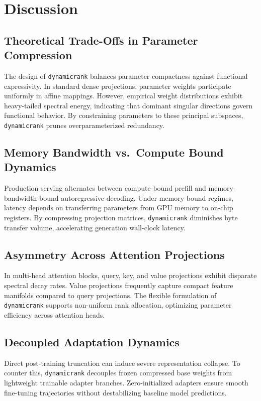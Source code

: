 \section{Discussion}

\subsection{Theoretical Trade-Offs in Parameter Compression}
The design of \texttt{dynamicrank} balances parameter compactness against functional expressivity. In standard dense projections, parameter weights participate uniformly in affine mappings. However, empirical weight distributions exhibit heavy-tailed spectral energy, indicating that dominant singular directions govern functional behavior. By constraining parameters to these principal subspaces, \texttt{dynamicrank} prunes overparameterized redundancy.

\subsection{Memory Bandwidth vs.\ Compute Bound Dynamics}
Production serving alternates between compute-bound prefill and memory-bandwidth-bound autoregressive decoding. Under memory-bound regimes, latency depends on transferring parameters from GPU memory to on-chip registers. By compressing projection matrices, \texttt{dynamicrank} diminishes byte transfer volume, accelerating generation wall-clock latency.

\subsection{Asymmetry Across Attention Projections}
In multi-head attention blocks, query, key, and value projections exhibit disparate spectral decay rates. Value projections frequently capture compact feature manifolds compared to query projections. The flexible formulation of \texttt{dynamicrank} supports non-uniform rank allocation, optimizing parameter efficiency across attention heads.

\subsection{Decoupled Adaptation Dynamics}
Direct post-training truncation can induce severe representation collapse. To counter this, \texttt{dynamicrank} decouples frozen compressed base weights from lightweight trainable adapter branches. Zero-initialized adapters ensure smooth fine-tuning trajectories without destabilizing baseline model predictions.

